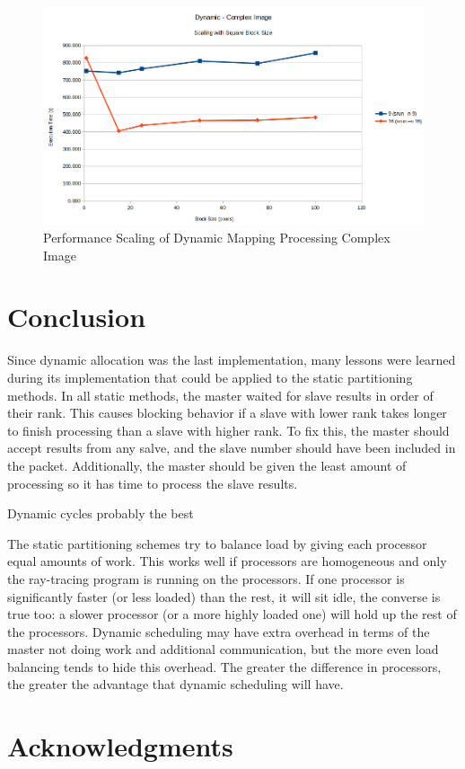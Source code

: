 \documentclass[11pt]{article}
\begin{document}
		\begin{figure}[H]
			\centering
			\includegraphics[width=0.7\linewidth]{"Pictures/Dynamic Complex"}
			\caption{Performance Scaling of Dynamic Mapping Processing Complex Image}
			\label{fig:dynamic-complex}
		\end{figure}

\section{Conclusion}

	Since dynamic allocation was the last implementation, many lessons were learned during its implementation that could be applied to the static partitioning methods. In all static methods, the master waited for slave results in order of their rank. This causes blocking behavior if a slave with lower rank takes longer to finish processing than a slave with higher rank. To fix this, the master should accept results from any salve, and the slave number should have been included in the packet. Additionally, the master should be given the least amount of processing so it has time to process the slave results. 
	
	Dynamic cycles probably the best
	
	The static partitioning schemes try to balance load by giving each processor equal amounts of work. This works well if processors are homogeneous and only the ray-tracing program is running on the processors. If one processor is significantly faster (or less loaded) than the rest, it will sit idle, the converse is true too: a slower processor (or a more highly loaded one) will hold up the rest of the processors. Dynamic scheduling may have extra overhead in terms of the master not doing work and additional communication, but the more even load balancing tends to hide this overhead. The greater the difference in processors, the greater the advantage that dynamic scheduling will have.
	
	

\section{Acknowledgments}
	
\end{document}
